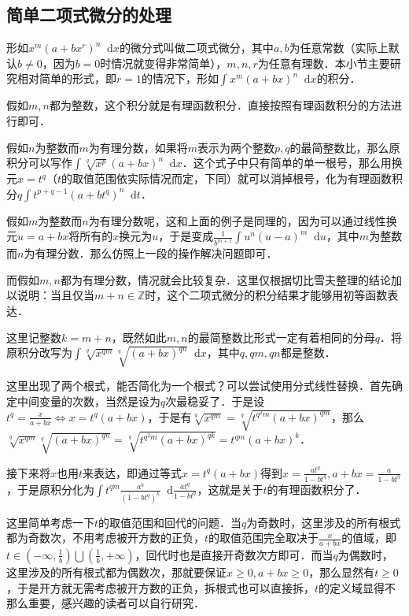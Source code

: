 \documentclass{ctexbook}
\newcommand*{\dif}{\mathop{}\!\mathrm{d}}
\begin{document}
\subsection{简单二项式微分的处理}
形如$x^{m}\left(a+bx^{r}\right)^{n}\dif{x}$的微分式叫做二项式微分，其中$a,b$为任意常数（实际上默认$b\ne0$，因为$b=0$时情况就变得非常简单），$m,n,r$为任意有理数．本小节主要研究相对简单的形式，即$r=1$的情况下，形如$\int x^{m}\left(a+bx\right)^{n}\dif{x}$的积分．\par
假如$m,n$都为整数，这个积分就是有理函数积分．直接按照有理函数积分的方法进行即可．\par
假如$n$为整数而$m$为有理分数，如果将$m$表示为两个整数$p,q$的最简整数比，那么原积分可以写作$\int\sqrt[q]{x^{p}}\left(a+bx\right)^{n}\dif{x}$．这个式子中只有简单的单一根号，那么用换元$x=t^{q}$（$t$的取值范围依实际情况而定，下同）就可以消掉根号，化为有理函数积分$q\int t^{p+q-1}\left(a+bt^{q}\right)^{n}\dif{t}$．\par
假如$m$为整数而$n$为有理分数呢，这和上面的例子是同理的，因为可以通过线性换元$u=a+bx$将所有的$x$换元为$u$，于是变成$\frac{1}{b^{m+1}}\int u^{n}\left(u-a\right)^{m}\dif{u}$，其中$m$为整数而$n$为有理分数．那么仿照上一段的操作解决问题即可．\par
而假如$m,n$都为有理分数，情况就会比较复杂．这里仅根据切比雪夫整理的结论加以说明：当且仅当$m+n\in\mathbb{Z}$时，这个二项式微分的积分结果才能够用初等函数表达．\par
这里记整数$k=m+n$，既然如此$m,n$的最简整数比形式一定有着相同的分母$q$．将原积分改写为$\int\sqrt[q]{x^{qm}}\sqrt[q]{\left(a+bx\right)^{qn}}\dif{x}$，其中$q,qm,qn$都是整数．\par
这里出现了两个根式，能否简化为一个根式？可以尝试使用分式线性替换．首先确定中间变量的次数，当然是设为$q$次最稳妥了．于是设$t^{q}=\frac{x}{a+bx}\Leftrightarrow x=t^{q}\left(a+bx\right)$，于是有$\sqrt[q]{x^{qm}}=\sqrt[q]{t^{q^{2}m}\left(a+bx\right)^{qm}}$，那么$\sqrt[q]{x^{qm}}\sqrt[q]{\left(a+bx\right)^{qn}}=\sqrt[q]{t^{q^{2}m}\left(a+bx\right)^{qk}}=t^{qm}\left(a+bx\right)^{k}$．\par
接下来将$x$也用$t$来表达，即通过等式$x=t^{q}\left(a+bx\right)$得到$x=\frac{at^{q}}{1-bt^{q}},a+bx=\frac{a}{1-bt^{q}}$，于是原积分化为$\int t^{qm}\frac{a^{k}}{\left(1-bt^{q}\right)^{k}}\dif{\frac{at^{q}}{1-bt^{q}}}$，这就是关于$t$的有理函数积分了．\par
这里简单考虑一下$t$的取值范围和回代的问题．当$q$为奇数时，这里涉及的所有根式都为奇数次，不用考虑被开方数的正负，$t$的取值范围完全取决于$\frac{x}{a+bx}$的值域，即$t\in\left(-\infty,\frac{1}{b}\right)\bigcup\left(\frac{1}{b},+\infty\right)$，回代时也是直接开奇数次方即可．而当$q$为偶数时，这里涉及的所有根式都为偶数次，那就要保证$x\ge0,a+bx\ge0$，那么显然有$t\ge0$，于是开方就无需考虑被开方数的正负，拆根式也可以直接拆，$t$的定义域显得不那么重要，感兴趣的读者可以自行研究．\par
\end{document}
